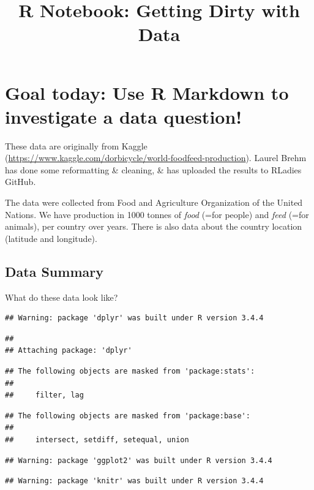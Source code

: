 \documentclass[]{article}
\title{R Notebook: Getting Dirty with Data}
\author{}
\date{}
\begin{document}
\maketitle

\section{Goal today: Use R Markdown to investigate a data
question!}\label{goal-today-use-r-markdown-to-investigate-a-data-question}

These data are originally from Kaggle
(\url{https://www.kaggle.com/dorbicycle/world-foodfeed-production}).
Laurel Brehm has done some reformatting \& cleaning, \& has uploaded the
results to RLadies GitHub.

The data were collected from Food and Agriculture Organization of the
United Nations. We have production in 1000 tonnes of \emph{food} (=for
people) and \emph{feed} (=for animals), per country over years. There is
also data about the country location (latitude and longitude).

\subsection{Data Summary}\label{data-summary}

What do these data look like?

\begin{verbatim}
## Warning: package 'dplyr' was built under R version 3.4.4
\end{verbatim}

\begin{verbatim}
## 
## Attaching package: 'dplyr'
\end{verbatim}

\begin{verbatim}
## The following objects are masked from 'package:stats':
## 
##     filter, lag
\end{verbatim}

\begin{verbatim}
## The following objects are masked from 'package:base':
## 
##     intersect, setdiff, setequal, union
\end{verbatim}

\begin{verbatim}
## Warning: package 'ggplot2' was built under R version 3.4.4
\end{verbatim}

\begin{verbatim}
## Warning: package 'knitr' was built under R version 3.4.4
\end{verbatim}
\end{document}
